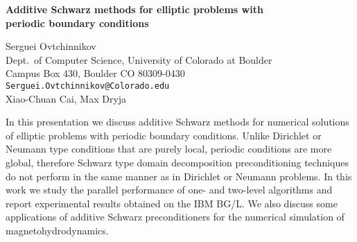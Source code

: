 \documentclass{report}
\begin{document}

\begin{center}
{\large
{\bf Additive Schwarz methods for elliptic problems with \\
	periodic boundary conditions}}

	Serguei Ovtchinnikov \\
	Dept.~of Computer Science, University of Colorado at
	Boulder \\ Campus Box 430, Boulder CO 80309-0430 \\
	{\tt Serguei.Ovtchinnikov@Colorado.edu} \\
	Xiao-Chuan Cai, Max Dryja
\end{center}
In this presentation we discuss additive Schwarz methods for
numerical solutions of elliptic problems with periodic
boundary conditions. Unlike Dirichlet or Neumann type
conditions that are purely local, periodic conditions are
more global, therefore Schwarz type domain decomposition
preconditioning techniques do not perform in the same manner
as in Dirichlet or Neumann problems. In this work we study
the parallel performance of one- and two-level algorithms
and report experimental results obtained on the IBM BG/L.
We also discuss some applications of additive Schwarz
preconditioners for the numerical simulation of
magnetohydrodynamics.



\end{document}
